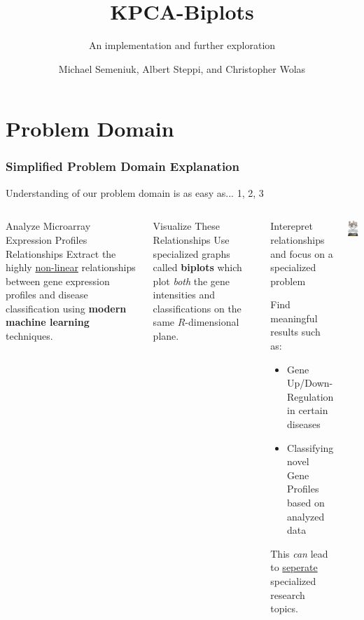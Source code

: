 \documentclass[serif]{beamer}
\title
{
	KPCA-Biplots
}
\subtitle{An implementation and further exploration}
\author
{
	Michael Semeniuk, Albert Steppi, and \linebreak
	Christopher Wolas
}
\date
{
	\begin{block}{}
	\begin{itemize}
		\item[~]
		{
			\underline{Mining Gene Expression Profiles: An Integrated} \linebreak
			\underline{Implementation of Kernel Principal Component} \linebreak
			\underline{Analysis and Singular Value Decomposition}
			\begin{itemize}
					\item[~]  Reverter et al,Genomics Proteomics Bioinformatics (2010)
			\end{itemize}
		}
	\end{itemize}	
	\end{block}
	
}
\begin{document}
	
	\section{Problem Domain}
	
	\begin{frame}
		\titlepage		
	\end{frame}

	\begin{frame}[t]
	\frametitle{Simplified Problem Domain Explanation}
		Understanding of our problem domain is as easy as... \linebreak
		\uncover<1-> {1, }
		\uncover<2-> {2, }
		\uncover<3>  {3}
		\begin{columns}[t]
		
			\column{2in}
			{
				\only<1>
				{
					\begin{block}
					{ 
						Analyze Microarray Expression Profiles Relationships
					}
					{
						Extract the highly \underline{non-linear} relationships
						between gene expression profiles and disease 
						classification using \textbf{modern machine learning} techniques.	
					}
					\end{block}
				}
				\only<2>
				{
					\begin{block}
						{ 
							Visualize These Relationships
						}
						{
							Use specialized graphs called \textbf{biplots}
							which plot \emph{both} the gene intensities and classifications on the same $R$-dimensional plane.
						}
					\end{block}
				}
				\only<3>
				{
					\begin{block}
					{
						Interepret relationships and focus on
						a specialized problem						
					}
					{
						\footnotesize 
						Find meaningful results such as:
						\begin{itemize}
							\item Gene Up/Down-\linebreak 
							Regulation in certain diseases
							\item Classifying novel Gene Profiles based on
							analyzed data
						\end{itemize}
						This \emph{can} lead to \underline{seperate} specialized
						research topics.
					}
					\end{block}
				}
			}
			\column{1in}
			{
				\only<1>
				{
					\begin{center}
						\includegraphics[width=1in]{images/microarray}	

\end{center}}}
\end{columns}
\end{frame}
\end{document}

